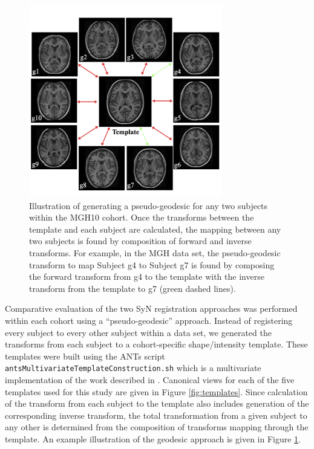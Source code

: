\documentclass{frontiersSCNS}
\begin{document}
\begin{figure}[htb]
  \centering
  \includegraphics[width=0.75\textwidth]{pseudo_geodesic.jpg}
  \caption{Illustration of generating a pseudo-geodesic for any two subjects
  within the MGH10 cohort.  Once the transforms between the
  template and each subject are calculated, the mapping between any two
  subjects is found by composition of forward and inverse transforms.  For
  example, in the MGH data set, the pseudo-geodesic transform to
  map Subject g4 to Subject g7 is found by composing the forward
  transform from g4 to the template with the inverse transform from the
  template to g7 (green dashed lines).
  }
  \label{fig:pseudo_geodesic}
\end{figure}

Comparative evaluation of the two SyN registration approaches was performed 
within each cohort using a ``pseudo-geodesic'' approach.  Instead of
registering every subject to every other subject within a data set,
we generated the transforms from each subject to a cohort-specific
shape/intensity template.  These templates were built using the ANTs script {\tt antsMultivariateTemplateConstruction.sh}
which is a multivariate implementation of the work described in
\cite{avants2010}. Canonical views for each of the five templates
used for this study are given in Figure \ref{fig:templates}.  
Since calculation of the transform from each subject to the template also
includes generation of the corresponding inverse transform, the total
transformation from a given subject to any other is determined from the composition
of transforms mapping through the template.  An example illustration of the
geodesic approach is given in Figure \ref{fig:pseudo_geodesic}.
\end{document}
